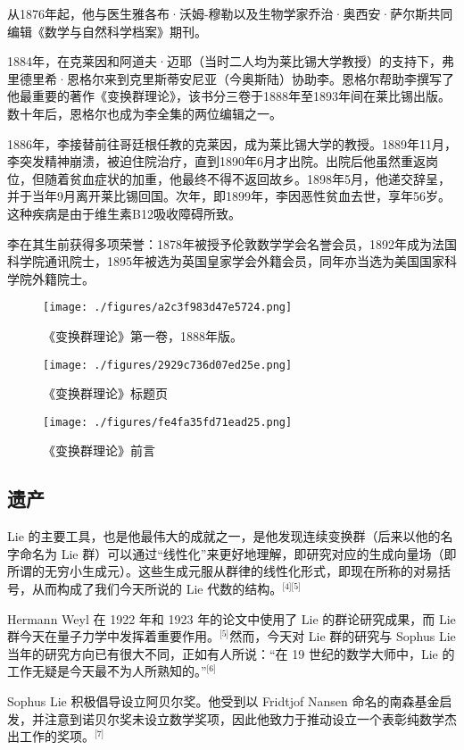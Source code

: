 从1876年起，他与医生雅各布·沃姆-穆勒以及生物学家乔治·奥西安·萨尔斯共同编辑《数学与自然科学档案》期刊。

1884年，在克莱因和阿道夫·迈耶（当时二人均为莱比锡大学教授）的支持下，弗里德里希·恩格尔来到克里斯蒂安尼亚（今奥斯陆）协助李。恩格尔帮助李撰写了他最重要的著作《变换群理论》，该书分三卷于1888年至1893年间在莱比锡出版。数十年后，恩格尔也成为李全集的两位编辑之一。

1886年，李接替前往哥廷根任教的克莱因，成为莱比锡大学的教授。1889年11月，李突发精神崩溃，被迫住院治疗，直到1890年6月才出院。出院后他虽然重返岗位，但随着贫血症状的加重，他最终不得不返回故乡。1898年5月，他递交辞呈，并于当年9月离开莱比锡回国。次年，即1899年，李因恶性贫血去世，享年56岁。这种疾病是由于维生素B12吸收障碍所致。

李在其生前获得多项荣誉：1878年被授予伦敦数学学会名誉会员，1892年成为法国科学院通讯院士，1895年被选为英国皇家学会外籍会员，同年亦当选为美国国家科学院外籍院士。
\begin{figure}[ht]
\centering
\texttt{[image: ./figures/a2c3f983d47e5724.png]}
\caption{《变换群理论》第一卷，1888年版。} \label{fig_SFSL_2}
\end{figure}
\begin{figure}[ht]
\centering
\texttt{[image: ./figures/2929c736d07ed25e.png]}
\caption{《变换群理论》标题页} \label{fig_SFSL_3}
\end{figure}
\begin{figure}[ht]
\centering
\texttt{[image: ./figures/fe4fa35fd71ead25.png]}
\caption{《变换群理论》前言} \label{fig_SFSL_4}
\end{figure}
\subsection{遗产}
Lie 的主要工具，也是他最伟大的成就之一，是他发现连续变换群（后来以他的名字命名为 Lie 群）可以通过“线性化”来更好地理解，即研究对应的生成向量场（即所谓的无穷小生成元）。这些生成元服从群律的线性化形式，即现在所称的对易括号，从而构成了我们今天所说的 Lie 代数的结构。\(^\text{[4][5]}\)

Hermann Weyl 在 1922 年和 1923 年的论文中使用了 Lie 的群论研究成果，而 Lie 群今天在量子力学中发挥着重要作用。\(^\text{[5]}\)然而，今天对 Lie 群的研究与 Sophus Lie 当年的研究方向已有很大不同，正如有人所说：“在 19 世纪的数学大师中，Lie 的工作无疑是今天最不为人所熟知的。”\(^\text{[6]}\)

Sophus Lie 积极倡导设立阿贝尔奖。他受到以 Fridtjof Nansen 命名的南森基金启发，并注意到诺贝尔奖未设立数学奖项，因此他致力于推动设立一个表彰纯数学杰出工作的奖项。\(^\text{[7]}\)

